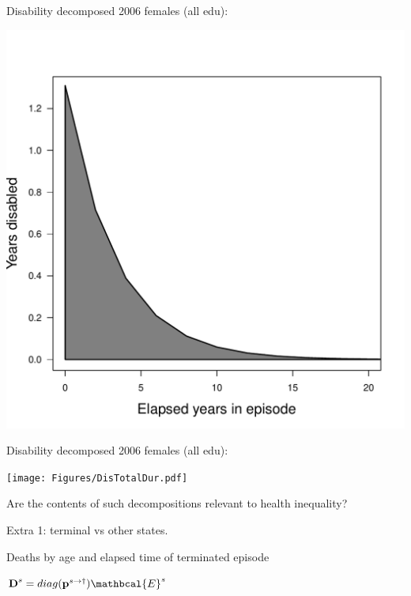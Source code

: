 \documentclass[20pt,usenames,dvipsnames]{beamer}
\begin{document}
\begin{frame}[plain]
\Large
Disability decomposed 2006 females (all edu):\vspace{-1em}
\begin{center}
\includegraphics[scale=1]{Figures/DisElapsed.pdf}
\end{center}
\end{frame}

\begin{frame}[plain]
\Large
Disability decomposed 2006 females (all edu):\vspace{-1em}
\begin{center}
\texttt{[image: Figures/DisTotalDur.pdf]}
\end{center}
\end{frame}

\begin{frame}[plain]
\Large
\centering
Are the contents of such decompositions relevant to health inequality?
\end{frame}

\begin{frame}[plain]
\Large
\centering
Extra 1: terminal vs other states.

\pause
Deaths by age and elapsed time of terminated episode

$\textbf{D}^s = diag(\textbf{p}^{s\rightarrow \dagger}) \mathbcal{E}^s $

\end{frame}
\end{document}
